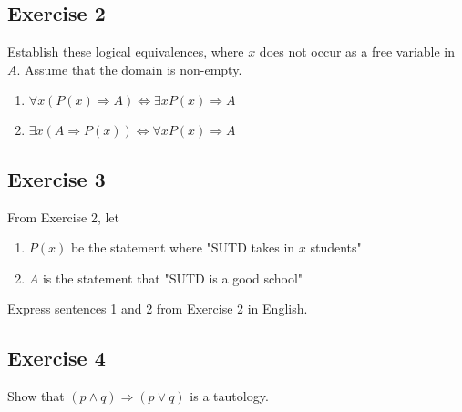 \documentclass{article}
\begin{document}
\subsection*{Exercise 2}
Establish these logical equivalences, where $x$ does not occur as a free variable in $A$. Assume that the domain is non-empty.
\begin{enumerate}
	\item $\forall x(P(x) \Rightarrow A) \Leftrightarrow \exists xP(x) \Rightarrow A$
	\item $\exists x(A \Rightarrow P(x)) \Leftrightarrow \forall xP(x) \Rightarrow A$
\end{enumerate}
\subsection*{Exercise 3}
From Exercise 2, let
\begin{enumerate}
	\item $P(x)$ be the statement where "SUTD takes in $x$ students"
	\item $A$ is the statement that "SUTD is a good school"
\end{enumerate}
Express sentences 1 and 2 from Exercise 2 in English.
\subsection*{Exercise 4}
Show that $(p \wedge q) \Rightarrow (p \vee q)$ is a tautology.
\end{document}
